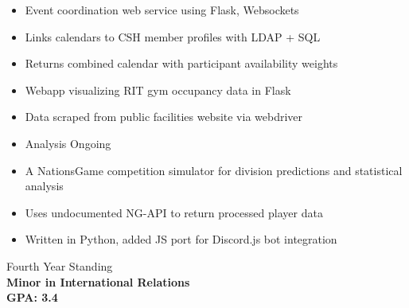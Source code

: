 \documentclass[10pt,a4paper,ragged2e,withhyper]{altacv}
\begin{document}
\begin{paracol}{2}
\begin{itemize}
    \item Event coordination web service using Flask, Websockets
    \item Links calendars to CSH member profiles with LDAP + SQL
    \item Returns combined calendar with participant availability weights
\end{itemize}

\divider

\begin{itemize}
    \item Webapp visualizing RIT gym occupancy data in Flask
    \item Data scraped from public facilities website via webdriver
    \item Analysis Ongoing
\end{itemize}

\divider


\begin{itemize}
    \item A NationsGame competition simulator for division predictions and statistical analysis
    \item Uses undocumented NG-API to return processed player data
    \item Written in Python, added JS port for Discord.js bot integration
\end{itemize}\par

\medskip

\switchcolumn


Fourth Year Standing\\
\textbf{Minor in International Relations}\\
\textbf{GPA: 3.4}

\medskip


\par\smallskip
{}
\par\medskip


\end{paracol}
\end{document}
